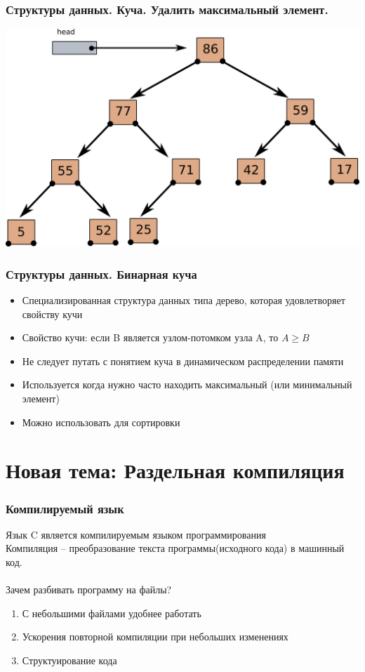 \documentclass[10pt]{beamer}
\begin{document}
\begin{frame}[fragile]
\frametitle{Структуры данных. Куча. Удалить максимальный элемент.} 
\begin{center}
\includegraphics[width=0.95\linewidth]{images/heap_pop_max_7.png}
\end{center}
\end{frame}

\begin{frame}[fragile]
\frametitle{Структуры данных. Бинарная куча} 
\begin{itemize}
\item Специализированная структура данных типа дерево, которая удовлетворяет свойству кучи
\item Свойство кучи: если B является узлом-потомком узла A, то $A \ge B$
\item Не следует путать с понятием куча в динамическом распределении памяти
\item Используется когда нужно часто находить максимальный (или минимальный элемент)
\item Можно использовать для сортировки
\end{itemize}
\end{frame}


\section{Новая тема: Раздельная компиляция}

\begin{frame}[fragile]
\frametitle{Компилируемый язык} 
Язык C является компилируемым языком программирования \\
Компиляция -- преобразование текста программы(исходного кода) в машинный код. \\
\quad\\
Зачем разбивать программу на файлы?
\begin{enumerate}
\item С небольшими файлами удобнее работать
\item Ускорения повторной компиляции при небольших изменениях
\item Структуирование кода
\end{enumerate}

\end{frame}
\end{document}
